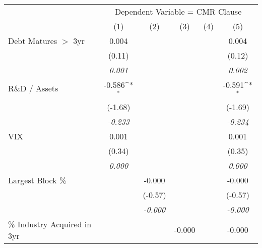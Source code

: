 {
\def\sym#1{\ifmmode^{#1}\else\(^{#1}\)\fi}
\begin{tabular}{l*{5}{c}}
\toprule
                &\multicolumn{5}{c}{Dependent Variable = CMR Clause}                                           \\\cmidrule(lr){2-6}
                &\multicolumn{1}{c}{(1)}         &\multicolumn{1}{c}{(2)}         &\multicolumn{1}{c}{(3)}         &\multicolumn{1}{c}{(4)}         &\multicolumn{1}{c}{(5)}         \\

\midrule Debt Matures $ > $ 3yr&    0.004         &                  &                  &                  &    0.004         \\
                &   (0.11)         &                  &                  &                  &   (0.12)         \\
                &\textit{0.001}         &                  &                  &                  &\textit{0.002}         \\
R\&D / Assets   &   -0.586\sym{*}  &                  &                  &                  &   -0.591\sym{*}  \\
                &  (-1.68)         &                  &                  &                  &  (-1.69)         \\
                &\textit{-0.233}         &                  &                  &                  &\textit{-0.234}         \\
VIX             &    0.001         &                  &                  &                  &    0.001         \\
                &   (0.34)         &                  &                  &                  &   (0.35)         \\
                &\textit{0.000}         &                  &                  &                  &\textit{0.000}         \\
Largest Block \%&                  &   -0.000         &                  &                  &   -0.000         \\
                &                  &  (-0.57)         &                  &                  &  (-0.57)         \\
                &                  &\textit{-0.000}         &                  &                  &\textit{-0.000}         \\
\% Industry Acquired in 3yr&                  &                  &   -0.000         &                  &   -0.000         \\

\end{tabular}}

